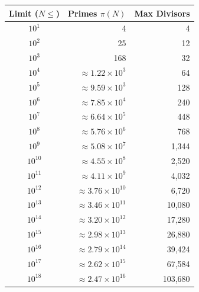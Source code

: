 \begin{center}
\renewcommand{\arraystretch}{1.1}
\begin{tabular}{|c|r|r|}
\hline
\textbf{Limit ($N \le$)} & \textbf{Primes $\pi(N)$} & \textbf{Max Divisors} \\ \hline
$10^1$ & 4 & 4 \\ \hline
$10^2$ & 25 & 12 \\ \hline
$10^3$ & 168 & 32 \\ \hline
$10^4$ & $\approx 1.22 \times 10^3$ & 64 \\ \hline
$10^5$ & $\approx 9.59 \times 10^3$ & 128 \\ \hline
$10^6$ & $\approx 7.85 \times 10^4$ & 240 \\ \hline
$10^7$ & $\approx 6.64 \times 10^5$ & 448 \\ \hline
$10^8$ & $\approx 5.76 \times 10^6$ & 768 \\ \hline
$10^9$ & $\approx 5.08 \times 10^7$ & 1,344 \\ \hline
$10^{10}$ & $\approx 4.55 \times 10^8$ & 2,520 \\ \hline
$10^{11}$ & $\approx 4.11 \times 10^9$ & 4,032 \\ \hline
$10^{12}$ & $\approx 3.76 \times 10^{10}$ & 6,720 \\ \hline
$10^{13}$ & $\approx 3.46 \times 10^{11}$ & 10,080 \\ \hline
$10^{14}$ & $\approx 3.20 \times 10^{12}$ & 17,280 \\ \hline
$10^{15}$ & $\approx 2.98 \times 10^{13}$ & 26,880 \\ \hline
$10^{16}$ & $\approx 2.79 \times 10^{14}$ & 39,424 \\ \hline
$10^{17}$ & $\approx 2.62 \times 10^{15}$ & 67,584 \\ \hline
$10^{18}$ & $\approx 2.47 \times 10^{16}$ & 103,680 \\ \hline
\end{tabular}
\end{center}